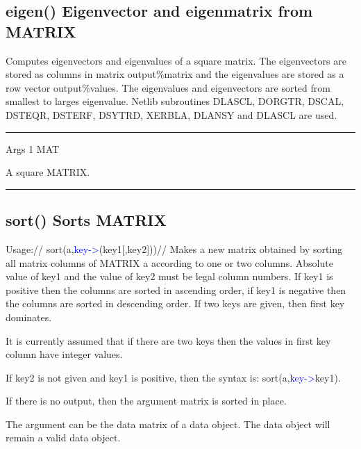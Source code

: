 \subsection{\textcolor{VioletRed}{eigen}() Eigenvector and eigenmatrix from MATRIX}
\label{eigen}
Computes eigenvectors and eigenvalues of a square matrix. The eigenvectors are stored as
columns in matrix output\%matrix and the eigenvalues are stored as a row vector
output\%values. The eigenvalues and eigenvectors are sorted from smallest to larges eigenvalue.
Netlib subroutines DLASCL, DORGTR, DSCAL, DSTEQR, DSTERF, DSYTRD,
XERBLA, DLANSY and DLASCL are used.
\vspace{0.3cm}
\hrule
\vspace{0.3cm}
\noindent Args \tabto{3cm} 1 \tabto{5cm}  MAT \tabto{7cm}
\begin{changemargin}{3cm}{0cm}
\noindent  A square MATRIX.
\end {changemargin}
\hrule
\vspace{0.2cm}
\subsection{\textcolor{VioletRed}{sort}() Sorts MATRIX}
\label{sort}
Usage://
\textcolor{VioletRed}{sort}(a,\textcolor{blue}{key->}(key1[,key2]))//
Makes a new matrix obtained by sorting all matrix columns of MATRIX a according to one or two columns.
Absolute value of key1 and the value of key2 must be legal column numbers.
If key1 is
positive then the columns are sorted in ascending order,
if key1 is negative then the columns
are sorted in descending order. If two keys are given, then first key dominates.
\begin{note}
It is currently
assumed that if there are two keys then the values in first key column have integer values.
\end{note}
\begin{note}
If key2 is not given and key1 is positive, then the syntax is: \textcolor{VioletRed}{sort}(a,\textcolor{blue}{key->}key1).
\end{note}
\begin{note}
If there is no output, then the argument matrix is sorted in place.
\end{note}
\begin{note}
The argument can be the data matrix of a data object. The data object will remain a
valid data object.
\end{note}
